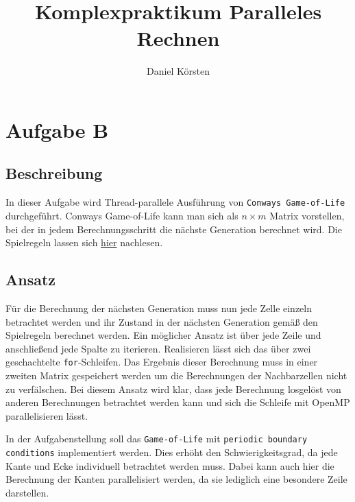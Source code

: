 \documentclass[german,plainarticle,hyperref,utf8]{zihpub}
\author{Daniel Körsten}
\title{Komplexpraktikum Paralleles Rechnen}
\begin{document}
	\section{Aufgabe B}
	\subsection{Beschreibung}
	In dieser Aufgabe wird Thread-parallele Ausführung von \verb|Conways Game-of-Life| durchgeführt. Conways Game-of-Life kann man sich als $n\times m$ Matrix vorstellen, bei der in jedem Berechnungsschritt die nächste Generation berechnet wird. Die Spielregeln lassen sich \href{https://de.wikipedia.org/wiki/Conways_Spiel_des_Lebens#Die_Spielregeln}{hier} nachlesen.
	
	\subsection{Ansatz}
	Für die Berechnung der nächsten Generation muss nun jede Zelle einzeln betrachtet werden und ihr Zustand in der nächsten Generation gemäß den Spielregeln berechnet werden.
	Ein möglicher Ansatz ist über jede Zeile und anschließend jede Spalte zu iterieren. Realisieren lässt sich das über zwei geschachtelte \verb|for|-Schleifen. Das Ergebnis dieser Berechnung muss in einer zweiten Matrix gespeichert werden um die Berechnungen der Nachbarzellen nicht zu verfälschen.
	Bei diesem Ansatz wird klar, dass jede Berechnung losgelöst von anderen Berechnungen betrachtet werden kann und sich die Schleife mit OpenMP parallelisieren lässt.
	
	In der Aufgabenstellung soll das \verb|Game-of-Life| mit \verb|periodic boundary conditions| implementiert werden. Dies erhöht den Schwierigkeitsgrad, da jede Kante und Ecke individuell betrachtet werden muss. Dabei kann auch hier die Berechnung der Kanten parallelisiert werden, da sie lediglich eine besondere Zeile darstellen.
\end{document}
